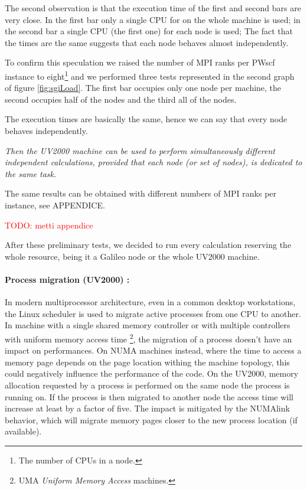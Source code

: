 \documentclass[a4paper,12pt]{article}
\newcommand\mynotes[1]{\begin{flushright}

\textcolor{red}{TODO: #1}\end{flushright}}
\begin{document}
The second observation is that the execution time of the first and second bars are very close. 
In the first bar only a single CPU for on the whole machine is used; in the second bar a single CPU (the first one) for each node is used;
The fact that the times are the same suggests that each node behaves almost independently.

To confirm this speculation we raised the number of MPI ranks per PWscf instance to eight\footnote{The number of CPUs in a node.} and we performed three tests represented  in the second graph of figure \ref{fig:sgiLoad}.
The first bar occupies only one node per machine, the second occupies half of the nodes and the third all of the nodes.

The execution times are basically the same, hence we can say that every node behaves independently.

\begin{center}
\textit{Then the UV2000 machine can be used to perform simultaneously different independent calculations, provided that each node (or set of nodes), is dedicated to the same task.}
\end{center}

The same results can be obtained with different numbers of MPI ranks per instance, see APPENDICE.
\mynotes{metti appendice}

\begin{framed}
After these preliminary tests, we decided to run every calculation reserving the whole resource, being it a Galileo node or the whole UV2000 machine.
\end{framed}




\paragraph{Process migration (UV2000) : }

In modern multiprocessor architecture, even in a common desktop workstations, the Linux scheduler is used to migrate active processes from one CPU to another. 
In machine with a single shared memory controller  or with multiple controllers with uniform memory access time \footnote{UMA \textit{Uniform Memory Access} machines.}, the migration of a process doesn't have an impact on performances.
On NUMA machines instead, where the time to access a memory page depends on the page location withing the machine topology, this could negatively influence the performance of the code.
On the UV2000, memory allocation requested by a process is performed on the same node the process is running on. 
If the process is then migrated to another node the access time will increase at least by a factor of five.
The impact is mitigated by the NUMAlink behavior, which will migrate memory pages closer to the new process location (if available).
\end{document}
